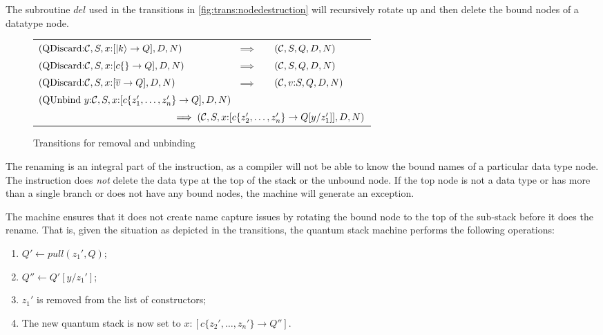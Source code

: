 The subroutine $del$ used in the transitions 
in \ref{fig:trans:nodedestruction}
will recursively rotate up and then delete the bound nodes of a datatype
 node.


\begin{figure}[htbp]
\begin{tabular}{lll}
$(\mathrm{QDiscard}{:}\mathcal{C},S,x{:}[\left\vert{k}\right\rangle\to Q],D,N) $&$ \implies$&$ (\mathcal{C},S,Q,D,N)$ \\[12pt]
$(\mathrm{QDiscard}{:}\mathcal{C},S,x{:}[c\{\} \to Q],D,N) $&$\implies $&$(\mathcal{C},S,Q,D,N)$ \\[12pt]
$(\mathrm{QDiscard}{:}\mathcal{C},S,x{:}[\overline{v} \to Q],D,N) $&$\implies$&$ (\mathcal{C},v{:}S,Q,D,N)$ \\[12pt]
\multicolumn{3}{l}{$(\mathrm{QUnbind}\ y{:}\cd,S,x{:}[c\{z_1',\ldots,z_n'\}\to Q],D,N) $} \\
\multicolumn{3}{r}{$\qquad\qquad\qquad\qquad\qquad\qquad\qquad\implies (\mathcal{C},S,x{:}[c\{z_2',\ldots,z_n'\} \to Q[y/z_1']],D,N)$}
\end{tabular}
\caption{Transitions for removal and unbinding}\label{fig:trans:noderemoval}
\end{figure}



 The 
renaming is an integral part of the 
instruction, as a compiler will not be able to know  the bound names of
a particular data type node. The instruction 
does \emph{not} delete the data type at the top of the stack or
the unbound node. If the top node is not a data type or has more than
a single branch or does not 
have any bound nodes, the machine will generate an exception. 

The machine ensures that it does not create  name capture issues
by rotating the bound node to the top of the sub-stack before
it does the rename. That is, given the situation as depicted in
the transitions, the quantum stack machine performs the 
following operations:

{\begin{singlespace}
\begin{enumerate}
\item{} $ Q' \leftarrow pull(z_1',Q)$;
\item{} $ Q'' \leftarrow  Q'[y/z_1'] $;
\item{} $z_1'$ is removed from the list of constructors;
\item{} The new quantum stack is now set to $x{:}[c\{z_2',\ldots,z_n'\} \to Q'']$.
\end{enumerate}
\end{singlespace}
}



